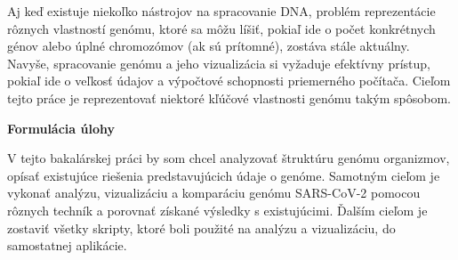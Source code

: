 Aj keď existuje niekoľko nástrojov na spracovanie DNA, problém reprezentácie rôznych vlastností genómu, ktoré sa môžu líšiť,
pokiaľ ide o počet konkrétnych génov alebo úplné chromozómov (ak sú prítomné), zostáva stále aktuálny. Navyše,
spracovanie genómu a jeho vizualizácia si vyžaduje efektívny prístup, pokiaľ ide o veľkosť údajov a výpočtové schopnosti
priemerného počítača.
Cieľom tejto práce je reprezentovať niektoré kľúčové vlastnosti genómu takým spôsobom.

\bigskip
\bigskip

{\noindent\LARGE{\textbf{Formulácia úlohy}}}

\smallskip
\smallskip

V tejto bakalárskej práci by som chcel analyzovať štruktúru genómu organizmov, opísať existujúce riešenia predstavujúcich údaje o genóme.
Samotným cieľom je vykonať analýzu, vizualizáciu a komparáciu genómu SARS-CoV-2 pomocou rôznych techník a porovnať získané výsledky s existujúcimi.
Ďalším cieľom je zostaviť všetky skripty, ktoré boli použité na analýzu a vizualizáciu, do samostatnej aplikácie.